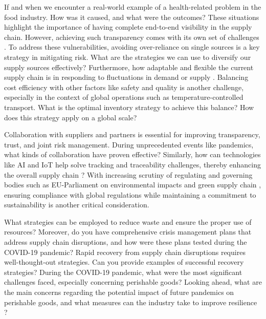 If and when we encounter a real-world example of a health-related problem in the food industry. How was it caused, and what were the outcomes? These situations highlight the importance of having complete end-to-end visibility in the supply chain. However, achieving such transparency comes with its own set of challenges \parencite{Wagner2006AnVulnerability, Elleuch2016ResilienceReview}. To address these vulnerabilities, avoiding over-reliance on single sources is a key strategy in mitigating risk. What are the strategies we can use to diversify our supply sources effectively? Furthermore, how adaptable and flexible the current supply chain is in responding to fluctuations in demand or supply \parencite{Yin2022SupplyFsQCA, Wang2024TheCOVID-19, Lin2021TheManufacturers}. Balancing cost efficiency with other factors like safety and quality is another challenge, especially in the context of global operations such as temperature-controlled transport. What is the optimal inventory strategy to achieve this balance? How does this strategy apply on a global scale?

Collaboration with suppliers and partners is essential for improving transparency, trust, and joint risk management. During unprecedented events like pandemics, what kinds of collaboration have proven effective? Similarly, how can technologies like AI and IoT help solve tracking and traceability challenges, thereby enhancing the overall supply chain \parencite{Wang2024TheCOVID-19, Simatupang2002TheChain, Singh2023Post-COVIDVaccination, Ramanathan2014SupplyPartnerships, Chen2017SupplyAgenda}? With increasing scrutiny of regulating and governing bodies such as EU-Parliament on environmental impacts and green supply chain \parencite{Amann2014DrivingUnion, Moazzem2022EnvironmentalProducts}, ensuring compliance with global regulations while maintaining a commitment to sustainability is another critical consideration. 

What strategies can be employed to reduce waste and ensure the proper use of resources? Moreover, do you have comprehensive crisis management plans that address supply chain disruptions, and how were these plans tested during the COVID-19 pandemic? Rapid recovery from supply chain disruptions requires well-thought-out strategies. Can you provide examples of successful recovery strategies? During the COVID-19 pandemic, what were the most significant challenges faced, especially concerning perishable goods? Looking ahead, what are the main concerns regarding the potential impact of future pandemics on perishable goods, and what measures can the industry take to improve resilience \parencite{Chowdhury2021COVID-19Review, Paul2021SupplyPandemic, Ivanov2017LiteratureChain, Chen2019BuildingIndustry}? 

